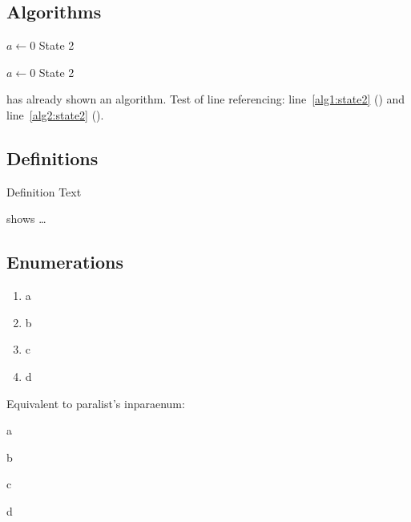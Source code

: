 \subsection{Algorithms}

\begin{algorithm}
  \caption{$algo$}
  \label{alg:example}
  \begin{algorithmic}[1]
    \State $a \gets 0$
    \State State 2\label{alg1:state2}
  \end{algorithmic}
\end{algorithm}

\begin{algorithm}
  \caption{Algorithm 2}
  \label{alg:example2}
  \begin{algorithmic}[1]
    \State $a \gets 0$
    \State State 2\label{alg2:state2}
  \end{algorithmic}
\end{algorithm}

 has already shown an algorithm.
Test of line referencing: line~\ref{alg1:state2} () and line~\ref{alg2:state2} ().

\subsection{Definitions}
\begin{definition}[Title]
  \label{def:def1}
  Definition Text
\end{definition}

 shows \ldots

\subsection{Enumerations}

\begin{enumerate}[label=\alph*)]
  \item a
  \item b
  \item c
  \item d
\end{enumerate}

Equivalent to paralist's inparaenum:
\begin{enumerate*}[label=\alph*)]
  \item a
  \item b
  \item c
  \item d
\end{enumerate*}

